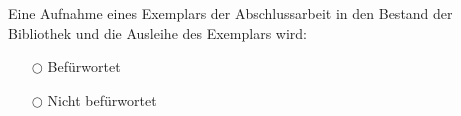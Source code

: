 \noindent
\hrulefill


\flushleft

Eine Aufnahme eines Exemplars der Abschlussarbeit in den Bestand der Bibliothek und die Ausleihe des Exemplars wird:

\begin{itemize}
	\item[$\bigcirc$] Befürwortet
	\item[$\bigcirc$] Nicht befürwortet
\end{itemize}

		\signature{Unterschrift des Betreuenden}

\cleardoublepage\par

